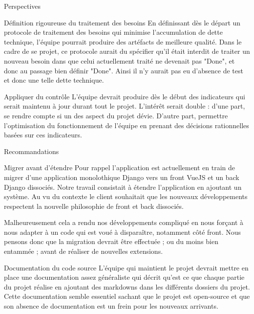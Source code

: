 \documentclass[]{article}
\begin{document}
{\begin{section}{Perspectives}
 \begin{subsection}{Définition rigoureuse du traitement des besoins}
     En définissant dès le départ un protocole de traitement des besoins qui minimise l'accumulation de dette technique, l'équipe pourrait produire des artéfacts de meilleure qualité. Dans le cadre de se projet, ce protocole aurait du spécifier qu'il était interdit de traiter un nouveau besoin dans que celui actuellement traité ne devenait pas "Done", et donc au passage bien définir "Done". Ainsi il n'y aurait pas eu d'absence de test et donc une telle dette technique.
 \end{subsection}

 \begin{subsection}{Appliquer du contrôle}
     L'équipe devrait produire dès le début des indicateurs qui serait maintenu à jour durant tout le projet. L'intérêt serait double : d'une part, se rendre compte si un des aspect du projet dévie. D'autre part, permettre l'optimisation du fonctionnement de l'équipe en prenant des décisions rationnelles basées sur ces indicateurs.
 \end{subsection}
\end{section}

\begin{section}{Recommandations}
 \begin{subsection}{Migrer avant d'étendre}
     Pour rappel l'application est actuellement en train de migrer d'une application monolothique Django vers un front VueJS et un back Django dissociés. Notre travail consistait à étendre l'application en ajoutant un système. Au vu du contexte le client souhaitait que les nouveaux développements respectent la nouvelle philosophie de front et back dissociés.

     Malheureusement cela a rendu nos développements compliqué en nous forçant à nous adapter à un code qui est voué à disparaître, notamment côté front. Nous pensons donc que la migration devrait être effectuée ; ou du moins bien entammée ; avant de réaliser de nouvelles extensions.
 \end{subsection}

 \begin{subsection}{Documentation du code source}
     L'équipe qui maintient le projet devrait mettre en place une documentation assez généraliste qui décrit qu'est ce que chaque partie du projet réalise en ajoutant des markdowns dans les différents dossiers du projet. Cette documentation semble essentiel sachant que le projet est open-source et que son absence de documentation est un frein pour les nouveaux arrivants.
 \end{subsection}
\end{section}

}
\end{document}
